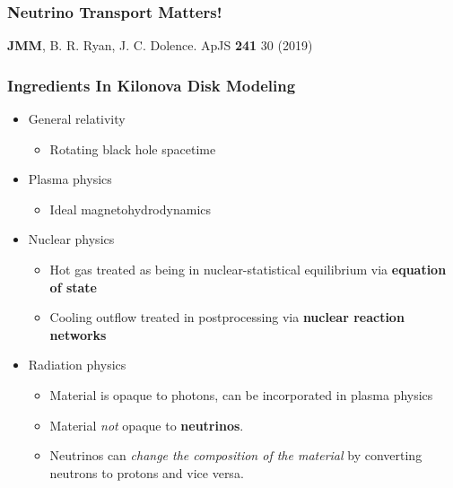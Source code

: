 \documentclass[]{beamer}
\begin{document}
\begin{frame}
  \frametitle{Neutrino Transport Matters!}
  \begin{center}
  \end{center}
  \begin{tiny}
    \textbf{JMM}, B. R. Ryan, J. C. Dolence. ApJS \textbf{241} 30 (2019) 
  \end{tiny}
\end{frame}

% 

\begin{frame}
  \frametitle{Ingredients In Kilonova Disk Modeling}
  \begin{itemize}
  \item General relativity
    \begin{itemize}
    \item Rotating black hole spacetime
    \end{itemize}
  \item Plasma physics
    \begin{itemize}
    \item Ideal magnetohydrodynamics
    \end{itemize}
  \item Nuclear physics
    \begin{itemize}
    \item Hot gas treated as being in nuclear-statistical equilibrium via \textbf{equation of state}
    \item Cooling outflow treated in postprocessing via \textbf{nuclear reaction networks}
    \end{itemize}
  \item Radiation physics
    \begin{itemize}
    \item Material is opaque to photons, can be incorporated in plasma physics
    \item Material \textit{not} opaque to \textbf{neutrinos}.
    \item Neutrinos can \textit{change the composition of the
        material} by converting neutrons to protons and vice versa.
    \end{itemize}
  \end{itemize}
\end{frame}
\end{document}
